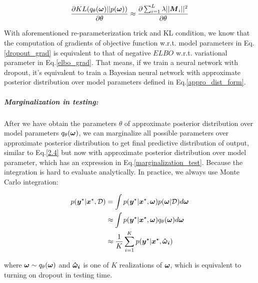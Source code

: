 \begin{equation} 
\begin{aligned}\label{KL_grad}
\frac{\partial KL(q_{\theta}(\boldsymbol \omega)||p(\boldsymbol \omega))}{\partial \theta} \approx \frac{\partial \sum_{i=1}^{L}\lambda||\boldsymbol M_{i}||^{2}}{\partial \theta}
\end{aligned}
\end{equation}

With aforementioned re-parameterization trick and KL condition, we know that the computation of gradients of objective function w.r.t. model parameters in Eq.\ref{dropout_grad} is equivalent to that of negative $ELBO$ w.r.t. variational parameter in Eq.\ref{elbo_grad}. That means, if we train a neural network with dropout, it's equivalent to train a Bayesian neural network with approximate posterior distribution over model parameters defined in Eq.\ref{appro_dist_form}.

\subparagraph{Marginalization in testing:}
After we have obtain the parameters $\theta$ of approximate posterior distribution over model parameters $q_{\theta}(\boldsymbol \omega)$, we can marginalize all possible parameters over approximate posterior distribution to get final predictive distribution of output, similar to Eq.\ref{2.4} but now with approximate posterior distribution over model parameter, which has an expression in Eq.\ref{marginalization_test}. Because the integration is hard to evaluate analytically. In practice, we always use Monte Carlo integration:

\begin{equation}
\begin{aligned} \label{marginalization_test}
p(\boldsymbol y^{\star}| \boldsymbol x^{\star},\mathcal D) &= \int p(\boldsymbol y^{\star} | \boldsymbol x^{\star}, \boldsymbol \omega) p(\boldsymbol \omega |\mathcal D)d\boldsymbol \omega \\
&\approx \int p(\boldsymbol y^{\star} | \boldsymbol x^{\star}, \boldsymbol \omega) q_{\theta}(\boldsymbol \omega)d\boldsymbol \omega \\
&\approx \frac{1}{K}\sum_{i=1}^{K} p(\boldsymbol y^{\star} | \boldsymbol x^{\star}, \boldsymbol{\hat \omega_{i}}) 
\end{aligned}
\end{equation}

where $\boldsymbol \omega \sim q_{\theta}(\boldsymbol \omega)$ and $\boldsymbol{\hat \omega_{i}}$ is one of $K$ realizations of $\boldsymbol \omega$, which is equivalent to turning on dropout in testing time. 



